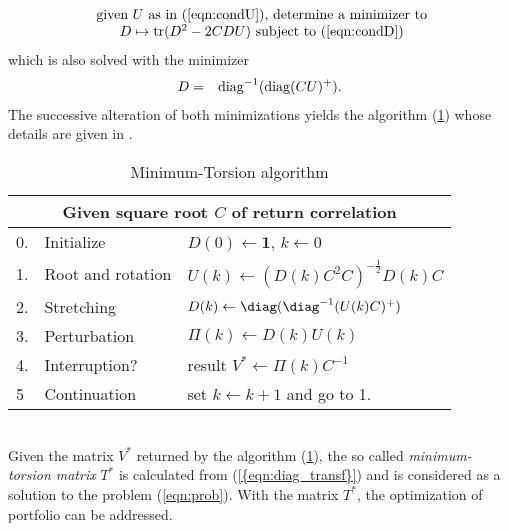{\begin{equation*}
\begin{array}{c}
\text{  given $U$ as in (\ref{eqn:condU}), determine a minimizer to} \\
\text{
	$D \mapsto {\rm tr} ( D^2 -2  C D U)$  subject to (\ref{eqn:condD})}
\end{array} 
\end{equation*}
which is also solved with the minimizer
\begin{eqnarray*}
D&=&{\rm diag}^{-1}({\rm diag}(CU)^+).
\end{eqnarray*}
The  successive  alteration of both minimizations yields the  algorithm (\ref{table_minimum(t)orsion_algorithm})
whose  details are given in  \cite{Meucci2013}.
\label{minimum(t)orsion_algorithm}
\begin{table}[!ht]
	\centering
	\begin{threeparttable}
		\begin{tabular}{ |l|l|l| }
			\hline
			\multicolumn{3}{|c|}{Given square root $C$ of return correlation} \\
			\hline
			0. & Initialize & $D(0) \leftarrow \mathbf{1}$, $k\leftarrow 0$ \\
			1. & Root and rotation & $U(k) \leftarrow (D(k)C^2C)^{-\frac{1}{2}} D(k)C$  \\
			2. & Stretching &  $D(k) \leftarrow \diag(\diag^{-1}(U(k)C)^+)$ \\
			3. & Perturbation & $\Pi(k) \leftarrow D(k)U(k)$ \\
			4. & Interruption? & result $V^* \leftarrow \Pi(k) C^{-1}$ \\
		    5 &  Continuation & set  $k \leftarrow k+1$ and go to 1. \\ 
			\hline
		\end{tabular}
		\begin{tablenotes}
		\end{tablenotes}
		\caption{Minimum-Torsion algorithm}\label{table_minimum(t)orsion_algorithm}  
	\end{threeparttable}
\end{table}
\\[5pt]
Given the matrix $V^*$ returned by the  algorithm (\ref{table_minimum(t)orsion_algorithm}), 
the  so called {\it  minimum-torsion matrix} $T^*$  is calculated from (\ref{{eqn:diag_transf}}) and is considered as a solution to the problem (\ref{eqn:prob}). With  the  matrix  $T^*$,   the optimization of portfolio can be addressed.
 

}
